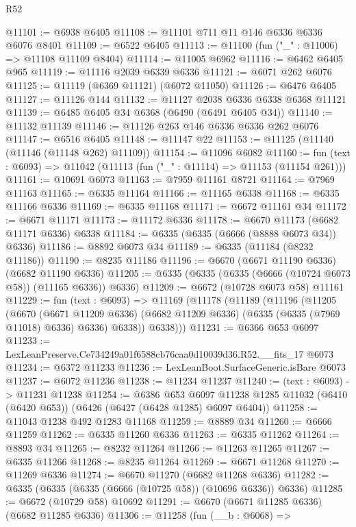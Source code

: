 \begin{lexlean}{R52}
\begin{coremodule}
@11101 := @6938 @6405
@11108 := @11101 @711 @11 @146 @6336 @6336 @6076 @8401
@11109 := @6522 @6405
@11113 := @11100 (fun ("_" : @11006) => @11108 @11109 @8404)
@11114 := @11005 @6962
@11116 := @6462 @6405 @965
@11119 := @11116 @2039 @6339 @6336
@11121 := @6071 @262 @6076
@11125 := @11119 (@6369 @11121) (@6072 @11050)
@11126 := @6476 @6405
@11127 := @11126 @144
@11132 := @11127 @2038 @6336 @6338 @6368 @11121
@11139 := @6485 @6405 @34 @6368 (@6490 (@6491 @6405 @34))
@11140 := @11132 @11139
@11146 := @11126 @263 @146 @6336 @6336 @262 @6076
@11147 := @6516 @6405
@11148 := @11147 @22
@11153 := @11125 (@11140 (@11146 (@11148 @262) @11109))
@11154 := @11096 @6082
@11160 := fun (text : @6093) => @11042 (@11113 (fun ("_" : @11114) => @11153 (@11154 @261)))
@11161 := @10691 @6073
@11163 := @7959 @11161 @8721
@11164 := @7969 @11163
@11165 := @6335 @11164
@11166 := @11165 @6338
@11168 := @6335 @11166 @6336
@11169 := @6335 @11168
@11171 := @6672 @11161 @34
@11172 := @6671 @11171
@11173 := @11172 @6336
@11178 := @6670 @11173 (@6682 @11171 @6336) @6338
@11184 := @6335 (@6335 (@6666 (@8888 @6073 @34)) @6336)
@11186 := @8892 @6073 @34
@11189 := @6335 (@11184 (@8232 @11186))
@11190 := @8235 @11186
@11196 := @6670 (@6671 @11190 @6336) (@6682 @11190 @6336)
@11205 := @6335 (@6335 (@6335 (@6666 (@10724 @6073 @58)) (@11165 @6336)) @6336)
@11209 := @6672 (@10728 @6073 @58) @11161
@11229 := fun (text : @6093) =>
  @11169
    (@11178
      (@11189
        (@11196
          (@11205
            (@6670
              (@6671 @11209 @6336)
              (@6682 @11209 @6336)
              (@6335 (@6335 (@7969 @11018) @6336) @6336)
              @6338))
          @6338)))
@11231 := @6366 @653 @6097
@11233 := LexLeanPreserve.Ce734249a01f6588cb76caa0d10039d36.R52.__fits_17 @6073
@11234 := @6372 @11233
@11236 := LexLeanBoot.SurfaceGeneric.isBare @6073
@11237 := @6072 @11236
@11238 := @11234 @11237
@11240 := (text : @6093) -> @11231 @11238
@11254 := @6386
    @653
    @6097
    @11238
    @1285
    @11032
    (@6410 (@6420 @653))
    (@6426 (@6427 (@6428 @1285) @6097 @6404))
@11258 := @11043 @1238 @492 @1283 @11168
@11259 := @8889 @34
@11260 := @6666 @11259
@11262 := @6335 @11260 @6336
@11263 := @6335 @11262
@11264 := @8893 @34
@11265 := @8232 @11264
@11266 := @11263 @11265
@11267 := @6335 @11266
@11268 := @8235 @11264
@11269 := @6671 @11268
@11270 := @11269 @6336
@11274 := @6670 @11270 (@6682 @11268 @6336)
@11282 := @6335 (@6335 (@6335 (@6666 (@10725 @58)) (@10696 @6336)) @6336)
@11285 := @6672 (@10729 @58) @10692
@11291 := @6670 (@6671 @11285 @6336) (@6682 @11285 @6336)
@11306 := @11258
    (fun (__b : @6068) =>

\end{coremodule}
\end{lexlean}
